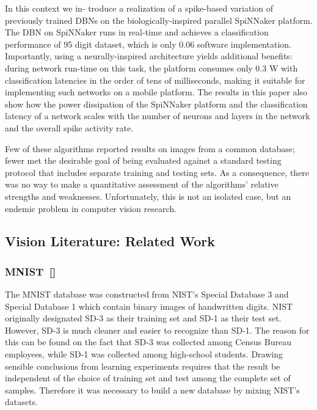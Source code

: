 In  this  context  we  in-
troduce  a  realization  of  a  spike-based  variation  of  previously
trained  DBNs  on  the  biologically-inspired  parallel  SpiNNaker
platform. The DBN on SpiNNaker runs in real-time and achieves
a classification performance of 95%
digit  dataset,  which  is  only  0.06%
software implementation. Importantly, using a neurally-inspired
architecture yields additional benefits: during network run-time
on this task, the platform consumes only 0.3 W with classification
latencies in the order of tens of milliseconds, making it suitable
for  implementing  such  networks  on  a  mobile  platform.  The
results in this paper also show how the power dissipation of the
SpiNNaker platform and the classification latency of a network
scales with the number of neurons and layers in the network and
the overall spike activity rate.


Few of these algorithms reported results on images from a common database; fewer met the desirable goal of being evaluated against a standard testing protocol that includes separate training and testing sets.
As a consequence, there was no way to make a quantitative assessment of the algorithms' relative strengths and weaknesses.
Unfortunately, this is not an isolated case, but an endemic problem in computer vision research.
\subsection{Vision Literature: Related Work}
\subsubsection{MNIST~[\cite{lecun_gradient-based_1998}]}
The MNIST database was constructed from NIST's Special Database 3 and Special Database 1 which contain binary images of handwritten digits. NIST originally designated SD-3 as their training set and SD-1 as their test set. However, SD-3 is much cleaner and easier to recognize than SD-1. The reason for this can be found on the fact that SD-3 was collected among Census Bureau employees, while SD-1 was collected among high-school students. Drawing sensible conclusions from learning experiments requires that the result be independent of the choice of training set and test among the complete set of samples. Therefore it was necessary to build a new database by mixing NIST's datasets.

